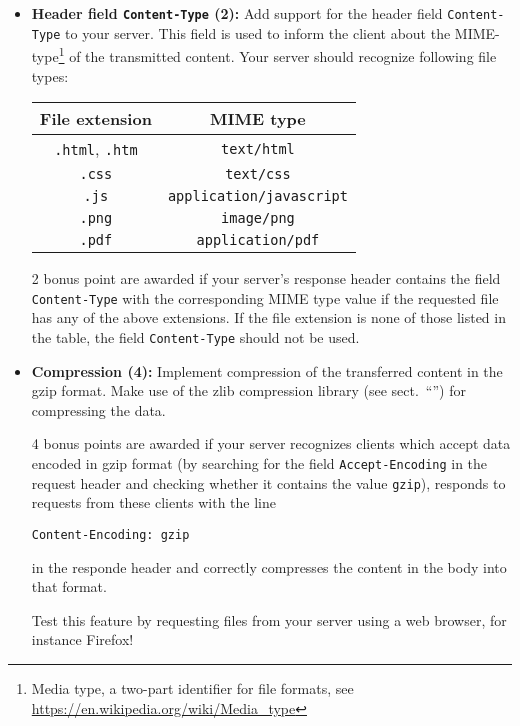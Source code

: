 \begin{itemize}

\item \textbf{Header field \texttt{Content-Type} (2):}
Add support for the header field \verb|Content-Type| to your server.
This field is used to inform the client about the MIME-type\footnote{
Media type, a two-part identifier for file formats,
see \url{https://en.wikipedia.org/wiki/Media_type}}
of the transmitted content.
Your server should recognize following file types:

\begin{center}
\begin{tabular}{c c}
\textbf{File extension} & \textbf{MIME type} \\
\hline
\verb|.html|, \verb|.htm| & \verb|text/html| \\
\verb|.css| & \verb|text/css| \\
\verb|.js| & \verb|application/javascript| \\
\verb|.png| & \verb|image/png| \\
\verb|.pdf| & \verb|application/pdf| \\
\end{tabular}
\end{center}

2 bonus point are awarded if your server's response header
contains the field \verb|Content-Type| with the corresponding MIME type value
if the requested file has any of the above extensions.
If the file extension is none of those listed in the table,
the field \verb|Content-Type| should not be used.

\item \textbf{Compression (4):}
Implement compression of the transferred content in the gzip format.
Make use of the zlib compression library (see sect.~``'')
for compressing the data.

4 bonus points are awarded if your server recognizes clients
which accept data encoded in gzip format
(by searching for the field \verb|Accept-Encoding| in the request header
and checking whether it contains the value \verb|gzip|),
responds to requests from these clients with the line

\verb|Content-Encoding: gzip|

in the responde header
and correctly compresses the content in the body into that format.

Test this feature by requesting files from your server using a web browser,
for instance Firefox!


\end{itemize}
